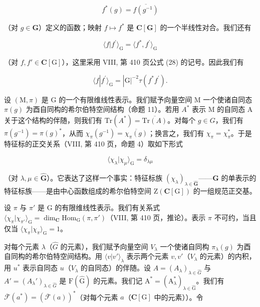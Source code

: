 \[
f ^ {*} (g) = \overline {{f (g ^ {- 1})}}\tag{51}
\]

（对 \(g \in \mathbf{G}\)）定义的函数；映射 \(f \mapsto f^*\) 是 \(\mathbf{C}[\mathbf{G}]\) 的一个半线性对合。我们还有

\[
\langle f | f ^ {\prime} \rangle_ {\mathrm{G}} = \langle f ^ {*}, f ^ {\prime} \rangle_ {\mathrm{G}}\tag{52}
\]

（对 \(f, f' \in \mathbf{C}[\mathrm{G}]\)），这里采用 VIII, 第 410 页公式 (28) 的记号。因此我们有

\[
\langle f | f ^ {\prime} \rangle_ {\mathrm{G}} = | \mathrm{G} | ^ {- 2} \tau (f ^ {*} f ^ {\prime}).\tag{53}
\]

设 \((\mathrm{M},\pi)\) 是 G 的一个有限维线性表示。我们赋予向量空间 M 一个使诸自同态 \(\pi(g)\) 为酉自同构的希尔伯特空间结构（命题 11）。若用 \(A^{*}\) 表示 M 的自同态 A 关于这个结构的伴随，则我们有 \(\mathrm{Tr}(A^{*})=\overline{\mathrm{Tr}(A)}\)。对每个 \(g\in G\)，我们有 \(\pi(g^{-1})=\pi(g)^{*}\)，从而 \(\chi_{\pi}(g^{-1})=\overline{\chi_{\pi}(g)}\)；换言之，我们有 \(\chi_{\pi}=\chi_{\pi}^{*}\)。于是特征标的正交关系（VIII, 第 410 页，命题 4）取如下形式

\[
\langle \chi_ {\lambda} | \chi_ {\mu} \rangle_ {\mathrm{G}} = \delta_ {\lambda \mu}\tag{54}
\]

（对 \(\lambda, \mu \in \widehat{\mathbf{G}}\)）。它表达了这样一个事实：特征标族 \((\chi_{\lambda})_{\lambda \in \widehat{\mathbf{G}}}\)——\(\mathbf{G}\) 的单表示的特征标族——是由中心函数组成的希尔伯特空间 \(\mathrm{Z}(\mathbf{C}[\mathrm{G}])\) 的一组规范正交基。

设 \(\pi\) 与 \(\pi'\) 是 G 的有限维线性表示。我们有关系式 \(\langle \chi_{\pi}|\chi_{\pi'}\rangle_{\mathrm{G}} = \dim_{\mathbf{C}}\mathrm{Hom}_{\mathrm{G}}(\pi, \pi')\)（VIII, 第 410 页，推论）。表示 \(\pi\) 不可约，当且仅当 \(\langle \chi_{\pi}|\chi_{\pi}\rangle_{\mathrm{G}} = 1\)。

对每个元素 \(\lambda\)（\(\widehat{G}\) 的元素），我们赋予向量空间 \(V_{\lambda}\) 一个使诸自同构 \(\pi_{\lambda}(g)\) 为酉自同构的希尔伯特空间结构。用 \(\langle v|v'\rangle_{\lambda}\) 表示两个元素 \(v, v'\)（\(V_{\lambda}\) 的元素）的内积，用 \(u^{*}\) 表示自同态 \(u\)（\(V_{\lambda}\) 的自同态）的伴随。设 \(A = (A_{\lambda})_{\lambda \in \widehat{G}}\) 与 \(A' = (A_{\lambda}')_{\lambda \in \widehat{G}}\) 是 \(\mathrm{F}(\widehat{\mathrm{G}})\) 的元素。我们记 \(\mathrm{A}^* = (\mathrm{A}_\lambda^*)_{\lambda \in \widehat{\mathrm{G}}}\)。我们有 \(\overline{\mathcal{F}} (a^{*}) = (\overline{\mathcal{F}} (a))^*\)（对每个元素 \(a\)（\(\mathbf{C}[\mathrm{G}]\) 中的元素））。令

